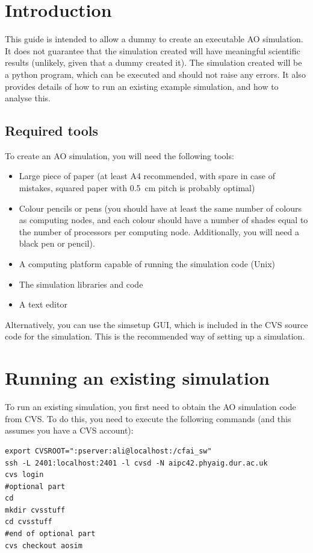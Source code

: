 \documentclass{article}
\begin{document}



\section{Introduction}
This guide is intended to allow a dummy to create an executable AO
simulation.  It does not guarantee that the simulation created will
have meaningful scientific results (unlikely, given that a dummy
created it).  The simulation created will be a python program, which
can be executed and should not raise any errors.  It also provides
details of how to run an existing example simulation, and how to
analyse this.

\subsection{Required tools}
To create an AO simulation, you will need the following tools:
\begin{itemize}
\item Large piece of paper (at least A4 recommended, with spare in case
  of mistakes, squared paper with 0.5~cm pitch is probably optimal)
\item Colour pencils or pens (you should have at least the same number
  of colours as computing nodes, and each colour should have a number
  of shades equal to the number of processors per computing node.
  Additionally, you will need a black pen or pencil).
\item A computing platform capable of running the simulation code
  (Unix)
\item The simulation libraries and code
\item A text editor
\end{itemize}
Alternatively, you can use the simsetup GUI, which is included in the
CVS source code for the simulation.  This is the recommended way of
setting up a simulation.

\section{Running an existing simulation}
To run an existing simulation, you first need to obtain the AO
simulation code from CVS.  To do this, you need to execute the
following commands (and this assumes you have a CVS account):
\begin{verbatim}
export CVSROOT=":pserver:ali@localhost:/cfai_sw"
ssh -L 2401:localhost:2401 -l cvsd -N aipc42.phyaig.dur.ac.uk
cvs login
#optional part
cd
mkdir cvsstuff
cd cvsstuff
#end of optional part
cvs checkout aosim
\end{verbatim}
\end{document}
